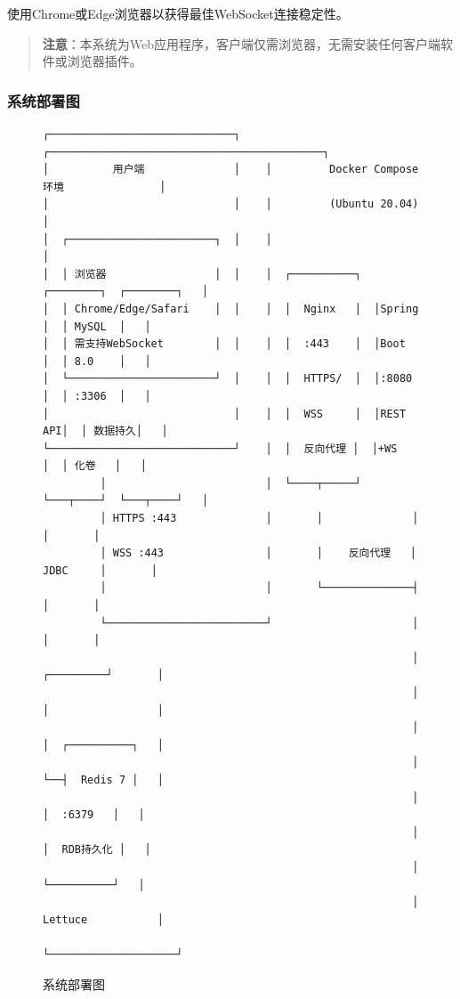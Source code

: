 \documentclass[12pt,a4paper]{ctexart}
\numberwithin{figure}{section}
\numberwithin{table}{section}
\begin{document}
使用Chrome或Edge浏览器以获得最佳WebSocket连接稳定性。

\begin{quote}
\textbf{注意}：本系统为Web应用程序，客户端仅需浏览器，无需安装任何客户端软件或浏览器插件。
\end{quote}

\subsubsection{系统部署图}

\begin{figure}[H]
\centering
{\small
\begin{verbatim}
┌─────────────────────────────┐    ┌───────────────────────────────────────────┐
│          用户端              │    │         Docker Compose 环境               │
│                             │    │         (Ubuntu 20.04)                     │
│  ┌───────────────────────┐  │    │                                            │
│  │ 浏览器                 │  │    │  ┌──────────┐  ┌────────┐  ┌────────┐   │
│  │ Chrome/Edge/Safari    │  │    │  │  Nginx   │  │Spring  │  │ MySQL  │   │
│  │ 需支持WebSocket        │  │    │  │  :443    │  │Boot    │  │ 8.0    │   │
│  └───────────────────────┘  │    │  │  HTTPS/  │  │:8080   │  │ :3306  │   │
│                             │    │  │  WSS     │  │REST API│  │ 数据持久│   │
└─────────────────────────────┘    │  │  反向代理 │  │+WS     │  │ 化卷   │   │
         │                         │  └────┬─────┘  └───┬────┘  └───┬────┘   │
         │ HTTPS :443              │       │              │            │       │
         │ WSS :443                │       │    反向代理   │   JDBC     │       │
         │                         │       └──────────────┤            │       │
         └─────────────────────────┘                      │            │       │
                                                          │  ┌─────────┘       │
                                                          │  │                 │
                                                          │  │  ┌──────────┐   │
                                                          │  └──┤  Redis 7 │   │
                                                          │     │  :6379   │   │
                                                          │     │  RDB持久化 │   │
                                                          │     └──────────┘   │
                                                          │  Lettuce           │
                                                          └────────────────────┘
\end{verbatim}
}
\caption{系统部署图}
\label{fig:deploy}
\end{figure}
\end{document}
